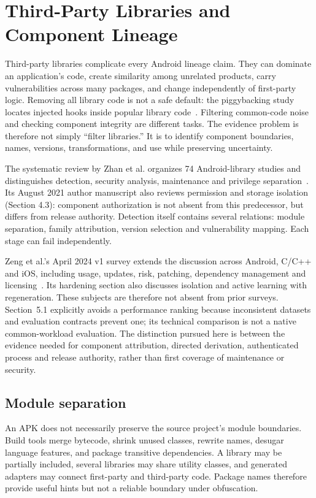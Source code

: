 \section{Third-Party Libraries and Component Lineage}
\label{sec:libraries}

Third-party libraries complicate every Android lineage claim. They can dominate an application's code, create similarity among unrelated products, carry vulnerabilities across many packages, and change independently of first-party logic. Removing all library code is not a safe default: the piggybacking study locates injected hooks inside popular library code~\cite{piggybacking}. Filtering common-code noise and checking component integrity are different tasks. The evidence problem is therefore not simply ``filter libraries.'' It is to identify component boundaries, names, versions, transformations, and use while preserving uncertainty.

The systematic review by Zhan et al. organizes 74 Android-library studies and distinguishes detection, security analysis, maintenance and privilege separation~\cite{tpl}. Its August 2021 author manuscript also reviews permission and storage isolation (Section 4.3): component authorization is not absent from this predecessor, but differs from release authority. Detection itself contains several relations: module separation, family attribution, version selection and vulnerability mapping. Each stage can fail independently.

Zeng et al.'s April 2024 v1 survey extends the discussion across Android, C/C++ and iOS, including usage, updates, risk, patching, dependency management and licensing~\cite{zengtpsurvey2024}. Its hardening section also discusses isolation and active learning with regeneration. These subjects are therefore not absent from prior surveys. Section~5.1 explicitly avoids a performance ranking because inconsistent datasets and evaluation contracts prevent one; its technical comparison is not a native common-workload evaluation. The distinction pursued here is between the evidence needed for component attribution, directed derivation, authenticated process and release authority, rather than first coverage of maintenance or security.

\subsection{Module separation}

An APK does not necessarily preserve the source project's module boundaries. Build tools merge bytecode, shrink unused classes, rewrite names, desugar language features, and package transitive dependencies. A library may be partially included, several libraries may share utility classes, and generated adapters may connect first-party and third-party code. Package names therefore provide useful hints but not a reliable boundary under obfuscation.

